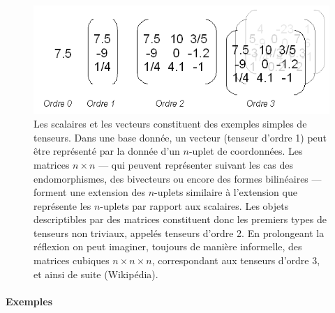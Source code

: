 \documentclass[french]{article}
\theoremstyle{definition}
\begin{document}
\begin{figure}[h!]
  \centering
  \includegraphics[scale=0.5]{figures/Tensor-order-comparison.png}
  \caption{Les scalaires et les vecteurs constituent des exemples simples de tenseurs. Dans une base donnée, un vecteur (tenseur d'ordre 1) peut être représenté par la donnée d'un \(n\)-uplet de coordonnées. Les matrices \(n \times n\) --- qui peuvent représenter suivant les cas des endomorphismes, des bivecteurs ou encore des formes bilinéaires --- forment une extension des \(n\)-uplets similaire à l'extension que représente les \(n\)-uplets par rapport aux scalaires. Les objets descriptibles par des matrices constituent donc les premiers types de tenseurs non triviaux, appelés tenseurs d'ordre 2. En prolongeant la réflexion on peut imaginer, toujours de manière informelle, des matrices cubiques \(n \times n \times n\), correspondant aux tenseurs d'ordre 3, et ainsi de suite (Wikipédia).}
  \label{}
\end{figure}
\paragraph{Exemples}
\end{document}
